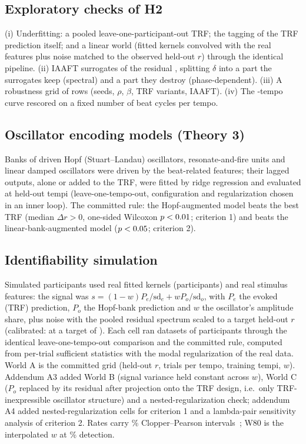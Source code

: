 \documentclass[journal]{IEEEtran}
\begin{document}
\subsection{Exploratory checks of H2}
(i) Underfitting: a pooled leave-one-participant-out TRF; the tagging of the TRF prediction itself; and a linear world (fitted kernels convolved with the real features plus noise matched to the observed held-out $r$) through the identical pipeline. (ii) IAAFT surrogates of the residual \cite{theiler1992testing,schreiber1996improved}, splitting $\delta$ into a part the surrogates keep (spectral) and a part they destroy (phase-dependent). (iii) A robustness grid of \NumNRows rows (seeds, $\rho$, $\beta$, TRF variants, IAAFT). (iv) The \NumNTempi-tempo curve rescored on a fixed number of beat cycles per tempo.

\subsection{Oscillator encoding models (Theory 3)}
Banks of driven Hopf (Stuart--Landau) oscillators, resonate-and-fire units and linear damped oscillators \cite{large2010canonical,large2015neural,izhikevich2001resonateandfire} were driven by the beat-related features; their lagged outputs, alone or added to the TRF, were fitted by ridge regression and evaluated at held-out tempi (leave-one-tempo-out, configuration and regularization chosen in an inner loop). The committed rule: the Hopf-augmented model beats the best TRF (median $\Delta r>0$, one-sided Wilcoxon $p<0.01$; criterion 1) and beats the linear-bank-augmented model ($p<0.05$; criterion 2).

\subsection{Identifiability simulation}
Simulated participants used real fitted kernels (\NumNKernels participants) and real stimulus features: the signal was $s=(1-w)P_e/\mathrm{sd}_e+wP_o/\mathrm{sd}_o$, with $P_e$ the evoked (TRF) prediction, $P_o$ the Hopf-bank prediction and $w$ the oscillator's amplitude share, plus noise with the pooled residual spectrum scaled to a target held-out $r$ (calibrated: \NumCalR at a target of \NumOpR). Each cell ran \NumNDatasets datasets of \NumNSimPart participants through the identical leave-one-tempo-out comparison and the committed rule, computed from per-trial sufficient statistics with the modal regularization of the real data. World A is the committed grid (held-out $r$, trials per tempo, training tempi, $w$). Addendum A3 added World B (signal variance held constant across $w$), World C ($P_o$ replaced by its residual after projection onto the TRF design, i.e.\ only TRF-inexpressible oscillator structure) and a nested-regularization check; addendum A4 added nested-regularization cells for criterion 1 and a lambda-pair sensitivity analysis of criterion 2. Rates carry \NumCiPct\% Clopper--Pearson intervals~\cite{clopper1934use}; W80 is the interpolated $w$ at \NumPowerPct\% detection.
\end{document}
